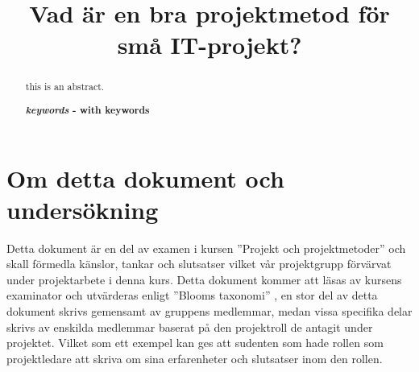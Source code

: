 \documentclass[conference]{IEEEtran}
\begin{document}
%
\title{Vad är en bra projektmetod för små IT-projekt?}


\author
    {
    }

\maketitle

\begin{abstract}
  this is an abstract.

  \textbf{\textit{keywords} - with keywords}
\end{abstract}

\IEEEpeerreviewmaketitle

\section{Om detta dokument och undersökning}
Detta dokument är en del av examen i kursen ''Projekt och projektmetoder'' och skall förmedla känslor, tankar och slutsatser vilket vår projektgrupp förvärvat under  projektarbete i denna kurs. Detta dokument kommer att läsas av kursens examinator och utvärderas enligt ''Blooms taxonomi''
, en stor del av detta dokument skrivs gemensamt av gruppens medlemmar, medan vissa specifika delar skrivs av enskilda medlemmar baserat på den projektroll de antagit under projektet. Vilket som ett exempel kan ges att sudenten som hade rollen som projektledare att skriva om sina erfarenheter och slutsatser inom den rollen.
\end{document}
